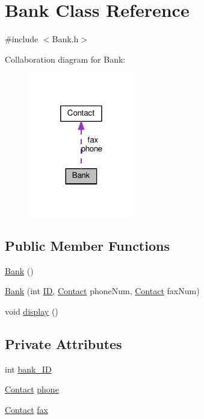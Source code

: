 \hypertarget{classBank}{\section{Bank Class Reference}
\label{classBank}
}


{\ttfamily \#include $<$Bank.\+h$>$}



Collaboration diagram for Bank\+:\nopagebreak
\begin{figure}[H]
\begin{center}
\leavevmode
\includegraphics[width=133pt]{classBank__coll__graph}
\end{center}
\end{figure}
\subsection*{Public Member Functions}
\begin{DoxyCompactItemize}
\item 
\hyperlink{classBank_a95972e189e85e1a572348811a8bf0d57}{Bank} ()
\item 
\hyperlink{classBank_a65e1c804648aeb2d180d6e54c92ebc20}{Bank} (int \hyperlink{classID}{I\+D}, \hyperlink{classContact}{Contact} phone\+Num, \hyperlink{classContact}{Contact} fax\+Num)
\item 
void \hyperlink{classBank_ab4a84d64ec7d51762d5fd0affa900f8c}{display} ()
\end{DoxyCompactItemize}
\subsection*{Private Attributes}
\begin{DoxyCompactItemize}
\item 
int \hyperlink{classBank_a06dfa13f15b434d0bd135229d8b71843}{bank\+\_\+\+I\+D}
\item 
\hyperlink{classContact}{Contact} \hyperlink{classBank_a27aa9c6b6d1884365910d118dcf2b5c6}{phone}
\item 
\hyperlink{classContact}{Contact} \hyperlink{classBank_a2289ec7adf9926d419db85a706d5e7d9}{fax}
\end{DoxyCompactItemize}



